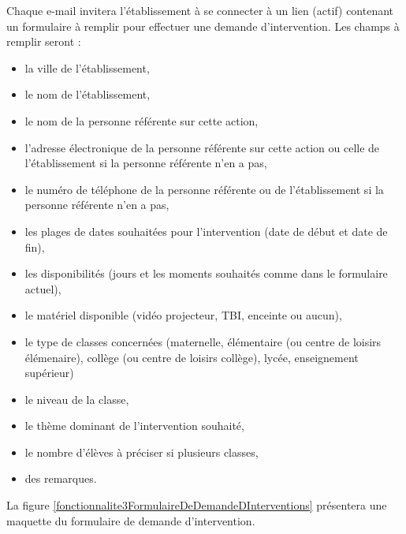Chaque e-mail invitera l'établissement à se connecter à un lien (actif) contenant un formulaire à remplir pour effectuer une demande d'intervention. Les champs à remplir seront : 
\begin{itemize}
\item la ville de l'établissement, 
\item le nom de l'établissement, 
\item le nom de la personne référente sur cette action, 
\item l'adresse électronique de la personne référente sur cette action ou celle de l'établissement si la personne  référente n'en a pas, 
\item le numéro de téléphone de la personne référente ou de l'établissement si la personne référente n'en a pas,
\item les plages de dates souhaitées pour l'intervention (date de début et date de fin),
\item les disponibilités (jours et les moments souhaités comme dans le formulaire actuel), 
\item le matériel disponible (vidéo projecteur, TBI, enceinte ou  aucun), 
\item le type de classes concernées (maternelle, élémentaire (ou centre de loisirs élémenaire), collège (ou centre de loisirs collège), lycée, enseignement supérieur)
\item le niveau de la classe, 
\item le thème dominant de l'intervention souhaité, 
\item le nombre d'élèves à préciser si plusieurs classes,
\item des remarques.
\end{itemize}
La figure \ref{fonctionnalite3FormulaireDeDemandeDInterventions} présentera une maquette du formulaire de demande d'intervention.
\newpage
